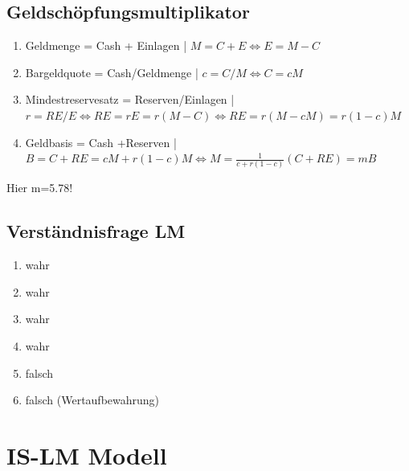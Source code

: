 \documentclass{scrartcl}
\begin{document}
\subsection{Geldsch\"{o}pfungsmultiplikator}
\begin{enumerate}[1)]
  \item Geldmenge = Cash + Einlagen | $M=C+E \Leftrightarrow E=M-C$
  \item Bargeldquote = Cash/Geldmenge | $c = C/M \Leftrightarrow C=cM$
  \item Mindestreservesatz = Reserven/Einlagen | $r=RE/E \Leftrightarrow RE =rE = r(M-C) \Leftrightarrow RE = r(M-cM) = r(1-c)M$
  \item Geldbasis = Cash +Reserven | $B=C+RE = cM + r(1-c)M \Leftrightarrow M = \frac{1}{c+r(1-c)}(C+RE) = mB$
\end{enumerate}
Hier m=5.78!
\subsection{Verst\"{a}ndnisfrage LM}
\begin{enumerate}[1)]
  \item wahr
  \item wahr
  \item wahr
  \item wahr
  \item falsch
  \item falsch (Wertaufbewahrung)
\end{enumerate}

\section{IS-LM Modell}
\end{document}
